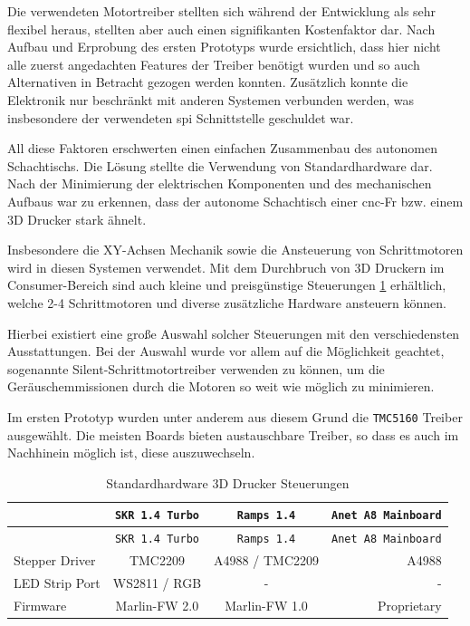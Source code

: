 Die verwendeten Motortreiber stellten sich während der Entwicklung als
sehr flexibel heraus, stellten aber auch einen signifikanten
Kostenfaktor dar. Nach Aufbau und Erprobung des ersten Prototyps wurde
ersichtlich, dass hier nicht alle zuerst angedachten Features der
Treiber benötigt wurden und so auch Alternativen in Betracht gezogen
werden konnten. Zusätzlich konnte die Elektronik nur beschränkt mit
anderen Systemen verbunden werden, was insbesondere der verwendeten
\gls{spi} Schnittstelle geschuldet war.

All diese Faktoren erschwerten einen einfachen Zusammenbau des autonomen
Schachtischs. Die Lösung stellte die Verwendung von Standardhardware
dar. Nach der Minimierung der elektrischen Komponenten und des
mechanischen Aufbaus war zu erkennen, dass der autonome Schachtisch
einer \gls{cnc}-Fr bzw. einem 3D Drucker stark ähnelt.

Insbesondere die XY-Achsen Mechanik sowie die Ansteuerung von
Schrittmotoren wird in diesen Systemen verwendet. Mit dem Durchbruch von
3D Druckern im Consumer-Bereich sind auch kleine und preisgünstige
Steuerungen \ref{3dmarlinctl} erhältlich, welche 2-4 Schrittmotoren und
diverse zusätzliche Hardware ansteuern können.

Hierbei existiert eine große Auswahl solcher Steuerungen mit den
verschiedensten Ausstattungen. Bei der Auswahl wurde vor allem auf die
Möglichkeit geachtet, sogenannte Silent-Schrittmotortreiber verwenden zu
können, um die Geräuschemmissionen durch die Motoren so weit wie möglich
zu minimieren.

Im ersten Prototyp wurden unter anderem aus diesem Grund die
\passthrough{\lstinline!TMC5160!} Treiber ausgewählt. Die meisten Boards
\label{3dmarlinctl} bieten austauschbare Treiber, so dass es auch im
Nachhinein möglich ist, diese auszuwechseln.

\begin{longtable}[]{@{}lccr@{}}
\caption{Standardhardware 3D Drucker Steuerungen
\label{3dmarlinctl}}\tabularnewline
\toprule
& \passthrough{\lstinline!SKR 1.4 Turbo!} &
\passthrough{\lstinline!Ramps 1.4!} &
\passthrough{\lstinline!Anet A8 Mainboard!}\tabularnewline
\midrule
\endfirsthead
\toprule
& \passthrough{\lstinline!SKR 1.4 Turbo!} &
\passthrough{\lstinline!Ramps 1.4!} &
\passthrough{\lstinline!Anet A8 Mainboard!}\tabularnewline
\midrule
\endhead
Stepper Driver & TMC2209 & A4988 / TMC2209 & A4988\tabularnewline
LED Strip Port & WS2811 / RGB & - & -\tabularnewline
Firmware & Marlin-FW 2.0 & Marlin-FW 1.0 & Proprietary\tabularnewline
\bottomrule
\end{longtable}


